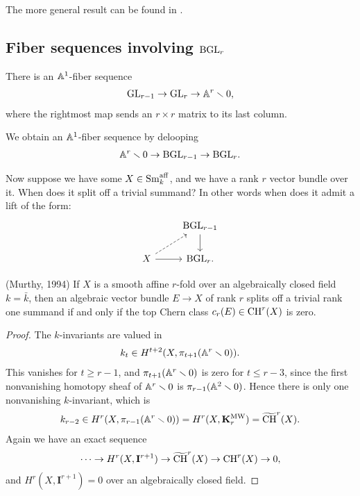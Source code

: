 \documentclass[11pt,openany]{book}
\providecommand{\aff}{\mathrm{aff}}
\providecommand{\KMW}{\mathbf{K}^\mathrm{MW}}
\providecommand{\CHW}{\widetilde{\mathrm{CH}}}
\begin{document}
\begin{remark} The more general result can be found in \cite{Swan67}.
\end{remark}



\subsection{Fiber sequences involving $\mathrm{BGL}_r$}

\begin{proposition} There is an $\mathbb{A}^1$-fiber sequence
\begin{align*}
    \mathrm{GL}_{r-1} \to \mathrm{GL}_r \to \mathbb{A}^r\smallsetminus 0,
\end{align*}
where the rightmost map sends an $r \times r$ matrix to its last column.
\end{proposition}

\begin{corollary} We obtain an $\mathbb{A}^1$-fiber sequence by delooping
\begin{align*}
    \mathbb{A}^r\smallsetminus 0 \to \mathrm{BGL}_{r-1} \to \mathrm{BGL}_r.
\end{align*}
\end{corollary}

Now suppose we have some $X \in \Sm_k^\aff$, and we have a rank $r$ vector bundle over it. When does it split off a trivial summand? In other words when does it admit a lift of the form:
\[ \begin{tikzcd}
     & \BGL_{r-1}\dar\\
    X\rar\ar[ur,dashed] & \BGL_r.
\end{tikzcd} \]
%

\begin{theorem} (Murthy, 1994) If $X$ is a smooth affine $r$-fold over an algebraically closed field $k = \bar{k}$, then an algebraic vector bundle $E \to X$ of rank $r$ splits off a trivial rank one summand if and only if the top Chern class $c_r(E) \in \mathrm{CH}^r(X)$ is zero.
\end{theorem}
\begin{proof} The $k$-invariants are valued in
\begin{align*}
    k_t \in H^{t+2}(X, \pi_{t+1}(\mathbb{A}^r\smallsetminus 0)).
\end{align*}
This vanishes for $t\ge r-1$, and $\pi_{t+1}(\mathbb{A}^r\smallsetminus 0)$ is zero for $t \le r-3$, since the first nonvanishing homotopy sheaf of $\mathbb{A}^r\smallsetminus 0$ is $\pi_{r-1}(\mathbb{A}^2\smallsetminus 0)$. Hence there is only one nonvanishing $k$-invariant, which is
\begin{align*}
    k_{r-2} \in H^{r}(X, \pi_{r-1}(\A^r\minus 0)) = H^r(X,\KMW_r) = \CHW^r(X).
\end{align*}
%
Again we have an exact sequence
\begin{align*}
    \cdots \to H^r(X,\mathbf{I}^{r+1}) \to \CHW^r(X) \to \CH^r(X) \to 0,
\end{align*}
and $H^r(X,\mathbf{I}^{r+1}) = 0$ over an algebraically closed field.
\end{proof}
\end{document}
